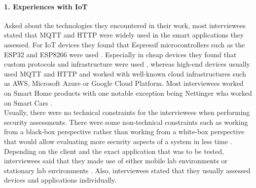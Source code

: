 \paragraph{1. Experiences with \ac{IoT}} Asked about the technologies they encountered in their work, most interviewees stated that \ac{MQTT} \cite{eisenschmidt_2020,bassem_2020,rigas_2020,nettinger_2020} and \ac{HTTP} \cite{eisenschmidt_2020,bassem_2020,rigas_2020,nettinger_2020,mouy_2020,bellemans_2020} were widely used in the smart applications they assessed. For \ac{IoT} devices they found that Espressif microcontrollers such as the ESP32 and ESP8266 were used \cite{eisenschmidt_2020,bellemans_2020}. Especially in cheap devices they found that custom protocols and infrastructure were used \cite{bassem_2020,rigas_2020,bellemans_2020}, whereas high-end devices usually used \ac{MQTT} and \ac{HTTP} and worked with well-known cloud infrastructures such as \ac{AWS}, Microsoft Azure or Google Cloud Platform. Most interviewees worked on Smart Home products \cite{eisenschmidt_2020,bassem_2020,rigas_2020,mouy_2020,bellemans_2020} with one notable exception being Nettinger who worked on Smart Cars \cite{nettinger_2020}.\\
Usually, there were no technical constraints for the interviewees when performing security assessments. There were some non-technical constraints such as working from a black-box perspective rather than working from a white-box perspective that would allow evaluating more security aspects of a system in less time \cite{eisenschmidt_2020,bassem_2020,rigas_2020}. Depending on the client and the exact application that was to be tested, interviewees said that they made use of either mobile lab environments \cite{bassem_2020,rigas_2020} or stationary lab environments \cite{eisenschmidt_2020,nettinger_2020,mouy_2020,bellemans_2020}. Also, interviewees stated that they usually assessed devices and applications individually.%

